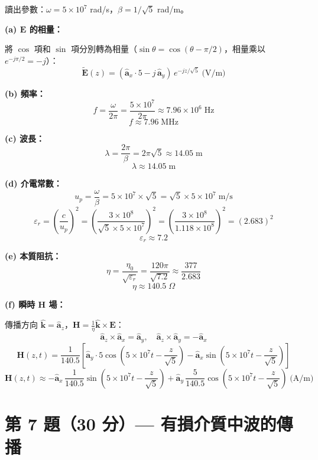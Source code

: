 \documentclass[12pt,a4paper]{article}
\newcommand{\vE}{\mathbf{E}}
\newcommand{\vH}{\mathbf{H}}
\newcommand{\vk}{\mathbf{k}}
\newcommand{\ax}{\hat{\mathbf{a}}_x}
\newcommand{\ay}{\hat{\mathbf{a}}_y}
\newcommand{\az}{\hat{\mathbf{a}}_z}
\begin{document}
\begin{solutionbox}[詳解]

讀出參數：$\omega = 5\times10^7$ rad/s，$\beta = 1/\sqrt{5}$ rad/m。

\textbf{(a) $\vE$ 的相量：}

將 $\cos$ 項和 $\sin$ 項分別轉為相量（$\sin\theta = \cos(\theta - \pi/2)$，相量乘以 $e^{-j\pi/2} = -j$）：
\[
  \boxed{\tilde{\vE}(z) = \left(\ax\cdot 5 - j\,\ay\right)\,e^{-jz/\sqrt{5}} \;\text{(V/m)}}
\]

\textbf{(b) 頻率：}
\[
  f = \frac{\omega}{2\pi} = \frac{5\times10^7}{2\pi}
  \approx 7.96\times10^6 \;\text{Hz}
\]
\[
  \boxed{f \approx 7.96 \;\text{MHz}}
\]

\textbf{(c) 波長：}
\[
  \lambda = \frac{2\pi}{\beta} = 2\pi\sqrt{5} \approx 14.05 \;\text{m}
\]
\[
  \boxed{\lambda \approx 14.05 \;\text{m}}
\]

\textbf{(d) 介電常數：}
\[
  u_p = \frac{\omega}{\beta} = 5\times10^7 \times \sqrt{5} = \sqrt{5}\times 5\times10^7 \;\text{m/s}
\]
\[
  \varepsilon_r = \left(\frac{c}{u_p}\right)^2 = \left(\frac{3\times10^8}{\sqrt{5}\times 5\times10^7}\right)^2
  = \left(\frac{3\times10^8}{1.118\times10^8}\right)^2
  = (2.683)^2
\]
\[
  \boxed{\varepsilon_r \approx 7.2}
\]

\textbf{(e) 本質阻抗：}
\[
  \eta = \frac{\eta_0}{\sqrt{\varepsilon_r}} = \frac{120\pi}{\sqrt{7.2}} \approx \frac{377}{2.683}
\]
\[
  \boxed{\eta \approx 140.5 \;\Omega}
\]

\textbf{(f) 瞬時 $\vH$ 場：}

傳播方向 $\hat{\vk} = \az$，$\vH = \frac{1}{\eta}\hat{\vk} \times \vE$：
\[
  \az \times \ax = \ay, \quad \az \times \ay = -\ax
\]
\[
  \vH(z,t) = \frac{1}{140.5}\left[\ay \cdot 5\cos\!\left(5\times10^7 t - \frac{z}{\sqrt{5}}\right)
  - \ax \sin\!\left(5\times10^7 t - \frac{z}{\sqrt{5}}\right)\right]
\]
\[
  \boxed{\vH(z,t) \approx -\ax\,\frac{1}{140.5}\sin\!\left(5\times10^7 t - \frac{z}{\sqrt{5}}\right)
  + \ay\,\frac{5}{140.5}\cos\!\left(5\times10^7 t - \frac{z}{\sqrt{5}}\right) \;\text{(A/m)}}
\]
\end{solutionbox}

\section{第 7 題（30 分）— 有損介質中波的傳播}
\end{document}
